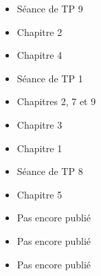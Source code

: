   \begin{itemize}
    \item Séance de TP 9
  \end{itemize}
  \begin{itemize}
    \item Chapitre 2
  \end{itemize}
  \begin{itemize}
    \item Chapitre 4
  \end{itemize}
  \begin{itemize}
    \item Séance de TP 1
  \end{itemize}
  \begin{itemize}
    \item Chapitres 2, 7 et 9
  \end{itemize}
  \begin{itemize}
    \item Chapitre 3
  \end{itemize}
  \begin{itemize}
    \item Chapitre 1
  \end{itemize}
  \begin{itemize}
    \item Séance de TP 8
  \end{itemize}
  \begin{itemize}
    \item Chapitre 5
  \end{itemize}
  \begin{itemize}
    \item Pas encore publié
  \end{itemize}
  \begin{itemize}
    \item Pas encore publié
  \end{itemize}
  \begin{itemize}
    \item Pas encore publié
  \end{itemize}
